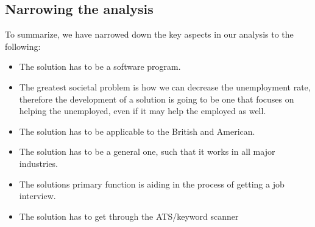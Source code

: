 \subsection{Narrowing the analysis}
To summarize, we have narrowed down the key aspects in our analysis to the
following:
\begin{itemize}
  \item The solution has to be a software program.
  \item The greatest societal problem is how we can decrease the unemployment rate, 
  therefore the development of a solution is going to be one that focuses on helping the unemployed, 
  even if it may help the employed as well.
  \item The solution has to be applicable to the British and American.
  \item The solution has to be a general one, such that it works in all major industries.
  \item The solutions primary function is aiding in the process of getting a job interview.
  \item The solution has to get through the ATS/keyword scanner
\end{itemize}
